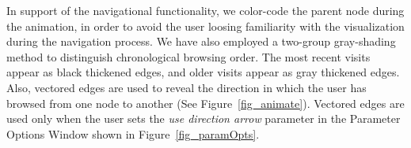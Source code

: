 \documentclass[10pt,psfig]{article}
\begin{document}
{\begin{itemize}
\end{itemize}

In support of the navigational functionality, we color-code the parent node during the animation, in order to avoid the user loosing familiarity with the visualization during the navigation process.
We have also employed a two-group gray-shading method to distinguish chronological browsing order.
The most recent visits appear as black thickened edges, and older visits appear as gray thickened edges.
Also, vectored edges are used to reveal the direction in which the user has browsed from one node to another (See Figure~\ref{fig_animate}).
Vectored edges are used only when the user sets the {\em use direction arrow} parameter in the Parameter Options Window shown in Figure~\ref{fig_paramOpts}.






}
\end{document}
